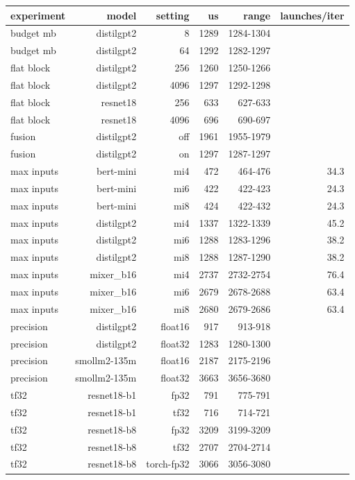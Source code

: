 \begin{tabular}{lrrrrr}
\toprule
experiment & model & setting & us & range & launches/iter \\
\midrule
budget mb & distilgpt2 & 8 & 1289 & 1284-1304 &  \\
budget mb & distilgpt2 & 64 & 1292 & 1282-1297 &  \\
flat block & distilgpt2 & 256 & 1260 & 1250-1266 &  \\
flat block & distilgpt2 & 4096 & 1297 & 1292-1298 &  \\
flat block & resnet18 & 256 & 633 & 627-633 &  \\
flat block & resnet18 & 4096 & 696 & 690-697 &  \\
fusion & distilgpt2 & off & 1961 & 1955-1979 &  \\
fusion & distilgpt2 & on & 1297 & 1287-1297 &  \\
max inputs & bert-mini & mi4 & 472 & 464-476 & 34.3 \\
max inputs & bert-mini & mi6 & 422 & 422-423 & 24.3 \\
max inputs & bert-mini & mi8 & 424 & 422-432 & 24.3 \\
max inputs & distilgpt2 & mi4 & 1337 & 1322-1339 & 45.2 \\
max inputs & distilgpt2 & mi6 & 1288 & 1283-1296 & 38.2 \\
max inputs & distilgpt2 & mi8 & 1288 & 1287-1290 & 38.2 \\
max inputs & mixer\_b16 & mi4 & 2737 & 2732-2754 & 76.4 \\
max inputs & mixer\_b16 & mi6 & 2679 & 2678-2688 & 63.4 \\
max inputs & mixer\_b16 & mi8 & 2680 & 2679-2686 & 63.4 \\
precision & distilgpt2 & float16 & 917 & 913-918 &  \\
precision & distilgpt2 & float32 & 1283 & 1280-1300 &  \\
precision & smollm2-135m & float16 & 2187 & 2175-2196 &  \\
precision & smollm2-135m & float32 & 3663 & 3656-3680 &  \\
tf32 & resnet18-b1 & fp32 & 791 & 775-791 &  \\
tf32 & resnet18-b1 & tf32 & 716 & 714-721 &  \\
tf32 & resnet18-b8 & fp32 & 3209 & 3199-3209 &  \\
tf32 & resnet18-b8 & tf32 & 2707 & 2704-2714 &  \\
tf32 & resnet18-b8 & torch-fp32 & 3066 & 3056-3080 &  \\
\bottomrule
\end{tabular}
